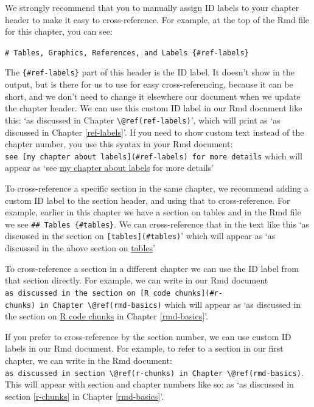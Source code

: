 \documentclass [11pt, proquest] {uwthesis}[2015/03/03]
\begin{document}
We strongly recommend that you to manually assign ID labels to your
chapter header to make it easy to cross-reference. For example, at the
top of the Rmd file for this chapter, you can see:

\texttt{\#\ Tables,\ Graphics,\ References,\ and\ Labels\ \{\#ref-labels\}}

The \texttt{\{\#ref-labels\}} part of this header is the ID label. It
doesn't show in the output, but is there for us to use for easy
cross-referencing, because it can be short, and we don't need to change
it elsewhere our document when we update the chapter header. We can use
this custom ID label in our Rmd document like this: `as discussed in
Chapter \texttt{\textbackslash{}@ref(ref-labels)}', which will print as
`as discussed in Chapter \ref{ref-labels}'. If you need to show custom
text instead of the chapter number, you use this syntax in your Rmd
document:
\texttt{see\ {[}my\ chapter\ about\ labels{]}(\#ref-labels)\ for\ more\ details}
which will appear as `see \protect\hyperlink{ref-labels}{my chapter
about labels} for more details'

To cross-reference a specific section in the same chapter, we recommend
adding a custom ID label to the section header, and using that to
cross-reference. For example, earlier in this chapter we have a section
on tables and in the Rmd file we see
\texttt{\#\#\ Tables\ \{\#tables\}}. We can cross-reference that in the
text like this `as discussed in the section on
\texttt{{[}tables{]}(\#tables)}' which will appear as `as discussed in
the above section on \protect\hyperlink{tables}{tables}'

To cross-reference a section in a different chapter we can use the ID
label from that section directly. For example, we can write in our Rmd
document
\texttt{as\ discussed\ in\ the\ section\ on\ {[}R\ code\ chunks{]}(\#r-chunks)\ in\ Chapter\ \textbackslash{}@ref(rmd-basics)}
which will appear as `as discussed in the section on
\protect\hyperlink{r-chunks}{R code chunks} in Chapter
\ref{rmd-basics}'.

If you prefer to cross-reference by the section number, we can use
custom ID labels in our Rmd document. For example, to refer to a section
in our first chapter, we can write in the Rmd document:
\texttt{as\ discussed\ in\ section\ \textbackslash{}@ref(r-chunks)\ in\ Chapter\ \textbackslash{}@ref(rmd-basics)}.
This will appear with section and chapter numbers like so: as `as
discussed in section \ref{r-chunks} in Chapter \ref{rmd-basics}'.
\end{document}
